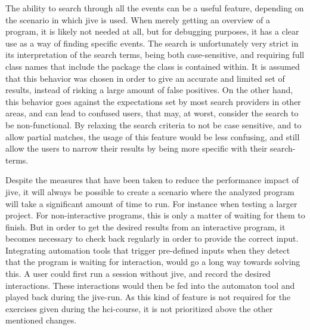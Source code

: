 The ability to search through all the events can be a useful feature, depending on the scenario in which \gls{jive} is used.
When merely getting an overview of a program, it is likely not needed at all, but for debugging purposes, it has a clear use as a way of finding specific events.
The search is unfortunately very strict in its interpretation of the search terms, being both case-sensitive, and requiring full class names that include the package the class is contained within.
It is assumed that this behavior was chosen in order to give an accurate and limited set of results, instead of risking a large amount of false positives.
On the other hand, this behavior goes against the expectations set by most search providers in other areas, and can lead to confused users, that may, at worst, consider the search to be non-functional.
By relaxing the search criteria to not be case sensitive, and to allow partial matches, the usage of this feature would be less confusing, and still allow the users to narrow their results by being more specific with their search-terms.


Despite the measures that have been taken to reduce the performance impact of \gls{jive}, it will always be possible to create a scenario where the analyzed program will take a significant amount of time to run.
For instance when testing a larger project.
For non-interactive programs, this is only a matter of waiting for them to finish.
But in order to get the desired results from an interactive program, it becomes necessary to check back regularly in order to provide the correct input.
Integrating automation tools that trigger pre-defined inputs when they detect that the program is waiting for interaction, would go a long way towards solving this.
A user could first run a session without \gls{jive}, and record the desired interactions.
These interactions would then be fed into the automaton tool and played back during the \gls{jive}-run.
As this kind of feature is not required for the exercises given during the \gls{hci}-course, it is not prioritized above the other mentioned changes.




